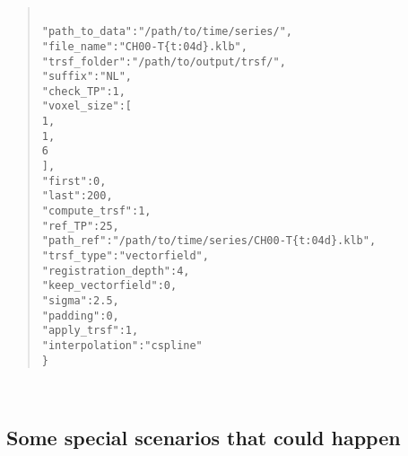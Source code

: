 \documentclass[10pt,a4paper]{book}
\newcommand\tab[1][.6cm]{\hspace*{#1}}
\newenvironment{code}[1]{\mbox{}\\[1ex]\hspace*{-#1cm}\begin{minipage}{150mm}\begin{quote}\tt}{\end{quote}\end{minipage}\mbox{}\\[1ex]}
\begin{document}
\begin{code}{0.8}
\{\\
\tab"path\_to\_data":"/path/to/time/series/",\\
\tab"file\_name":"CH00-T\{t:04d\}.klb",\\
\tab"trsf\_folder":"/path/to/output/trsf/",\\
\tab"suffix":"NL",\\
\tab"check\_TP":1,\\
\tab"voxel\_size":[\\
\tab\tab1,\\
\tab\tab1,\\
\tab\tab6\\
\tab],\\
\tab"first":0,\\
\tab"last":200,\\
\tab"compute\_trsf":1,\\
\tab"ref\_TP":25,\\
\tab"path\_ref":"/path/to/time/series/CH00-T\{t:04d\}.klb",\\
\tab"trsf\_type":"vectorfield",\\
\tab"registration\_depth":4,\\
\tab"keep\_vectorfield":0,\\
\tab"sigma":2.5,\\
\tab"padding":0,\\
\tab"apply\_trsf":1,\\
\tab"interpolation":"cspline"\\
\}
\end{code}
\subsection{Some special scenarios that could happen}
\end{document}
